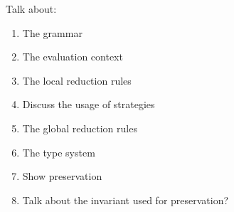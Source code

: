 Talk about:
\begin{enumerate}
    \item The grammar
    \item The evaluation context
    \item The local reduction rules
    \item Discuss the usage of strategies
    \item The global reduction rules
    \item The type system
    \item Show preservation
    \item Talk about the invariant used for preservation?
\end{enumerate}